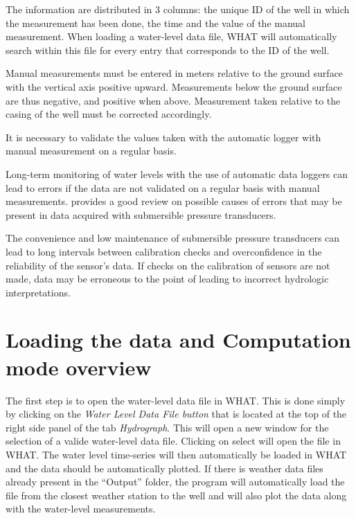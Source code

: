 \documentclass[WHATMANUAL.tex]{subfiles}
\begin{document}

The information are distributed in 3 columns: the unique ID of the well in which the measurement has been done, the time and the value of the manual measurement. When loading a water-level data file, WHAT will automatically search within this file for every entry that corresponds to the ID of the well. 

Manual measurements must be entered in meters relative to the ground surface with the vertical axis positive upward. Measurements below the ground surface are thus negative, and positive when above. Measurement taken relative to the casing of the well must be corrected accordingly.

It is necessary to validate the values taken with the automatic logger with manual measurement on a regular basis.

Long-term monitoring of water levels with the use of automatic data loggers can lead to errors if the data are not validated on a regular basis with manual measurements. \cite{freeman_use_2004} provides a good review on possible causes of errors that may be present in data acquired with submersible pressure transducers.

The convenience and low maintenance of submersible pressure transducers can lead to long intervals between calibration checks and overconfidence in the reliability of the sensor's data. If checks on the calibration of sensors are not made, data may be erroneous to the point of leading to incorrect hydrologic interpretations.

\section{Loading the data and Computation mode overview}

The first step is to open the water-level data file in WHAT. This is done simply by clicking on the \emph{Water Level Data File button} that is located at the top of the right side panel of the tab \emph{Hydrograph}. This will open a new window for the selection of a valide water-level data file. Clicking on select will open the file in WHAT. The water level time-series will then automatically be loaded in WHAT and the data should be automatically plotted. If there is weather data files already present in the ``Output'' folder, the program will automatically load the file from the closest weather station to the well and will also plot the data along with the water-level measurements.
\end{document}
